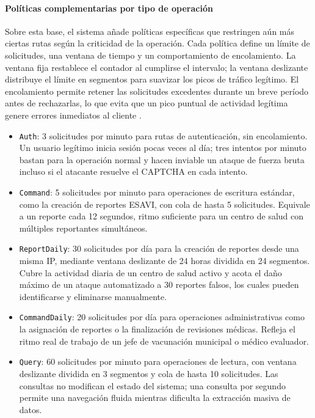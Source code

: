 \paragraph{Políticas complementarias por tipo de operación}

Sobre esta base, el sistema añade políticas específicas que restringen aún más ciertas rutas según la criticidad de la operación. 
Cada política define un límite de solicitudes, una ventana de tiempo y un comportamiento de encolamiento. 
La ventana fija restablece el contador al cumplirse el intervalo; la ventana deslizante distribuye el límite en segmentos para suavizar los picos de tráfico legítimo. 
El encolamiento permite retener las solicitudes excedentes durante un breve período antes de rechazarlas, lo que evita que un pico puntual de actividad legítima genere errores inmediatos al cliente \cite{microsoft_rate_limiting}.

\begin{itemize}
    \item \texttt{Auth}: 3 solicitudes por minuto para rutas de autenticación, sin encolamiento. Un usuario legítimo inicia sesión pocas veces al día; tres intentos por minuto bastan para la operación normal y hacen inviable un ataque de fuerza bruta incluso si el atacante resuelve el CAPTCHA en cada intento.
    \item \texttt{Command}: 5 solicitudes por minuto para operaciones de escritura estándar, como la creación de reportes ESAVI, con cola de hasta 5 solicitudes. Equivale a un reporte cada 12 segundos, ritmo suficiente para un centro de salud con múltiples reportantes simultáneos.
    \item \texttt{ReportDaily}: 30 solicitudes por día para la creación de reportes desde una misma IP, mediante ventana deslizante de 24 horas dividida en 24 segmentos. Cubre la actividad diaria de un centro de salud activo y acota el daño máximo de un ataque automatizado a 30 reportes falsos, los cuales pueden identificarse y eliminarse manualmente.
    \item \texttt{CommandDaily}: 20 solicitudes por día para operaciones administrativas como la asignación de reportes o la finalización de revisiones médicas. Refleja el ritmo real de trabajo de un jefe de vacunación municipal o médico evaluador.
    \item \texttt{Query}: 60 solicitudes por minuto para operaciones de lectura, con ventana deslizante dividida en 3 segmentos y cola de hasta 10 solicitudes. Las consultas no modifican el estado del sistema; una consulta por segundo permite una navegación fluida mientras dificulta la extracción masiva de datos.
\end{itemize}

